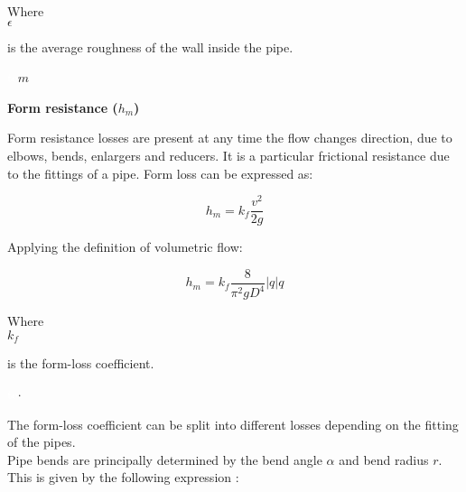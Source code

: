 \begin{minipage}[t]{0.20\textwidth}
Where\\
\hspace*{8mm} $\epsilon$ 
\end{minipage}
\begin{minipage}[t]{0.68\textwidth}
\vspace*{2mm}
is the average roughness of the wall inside the pipe.
 \end{minipage}
\begin{minipage}[t]{0.10\textwidth}
\vspace*{2mm}
\textcolor{White}{te}$\unit{m}$
\end{minipage}

%
\textbf{Form resistance (\texorpdfstring{$h_m$}{})} 
\label{FormResistance}

Form resistance losses are present at any time the flow changes direction, due to elbows, bends, enlargers and reducers. It is a particular frictional resistance due to the 
fittings of a pipe. Form loss can be expressed as: 

\begin{equation}
  h_m = k_f \frac{v^2}{2g}
\end{equation}


Applying the definition of volumetric flow:

\begin{equation}
   h_m = k_f \frac{8}{\pi^2gD^4}  |q| q
\label{Formloss}
\end{equation}

 \begin{minipage}[t]{0.20\textwidth}
Where\\
\hspace*{8mm} $k_f$ 
\end{minipage}
\begin{minipage}[t]{0.68\textwidth}
\vspace*{2mm}
is the form-loss coefficient.  
 \end{minipage}
\begin{minipage}[t]{0.10\textwidth}
\vspace*{2mm}
\textcolor{White}{te}$\unit{\cdot}$
\end{minipage}

The form-loss coefficient can be split into different losses depending on the 
fitting of the pipes. 
\\
Pipe bends are principally determined by the 
bend angle $\alpha$ and bend radius $r$. This is given by the following 
expression \cite{Design_Water}: 

